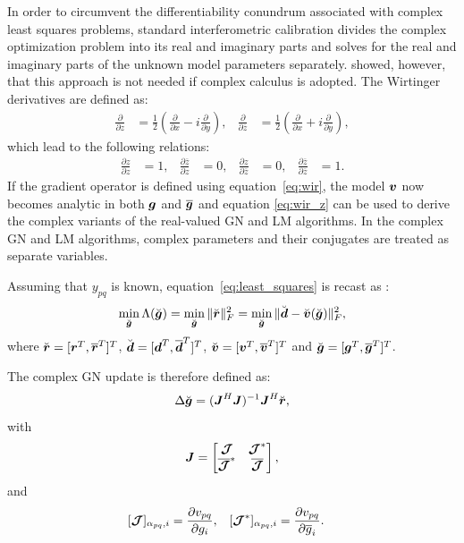\documentclass[useAMS,usenatbib]{mn2e}
\newcommand{\br}{\bmath{r}}
\newcommand{\bg}{\bmath{g}}
\newcommand{\bd}{\bmath{d}}
\newcommand{\bv}{\bmath{v}}
\newcommand{\bJ}{\bmath{J}}
\newcommand{\bmJ}{\bmath{\mathcal{J}}}
\newcommand{\conj}[1]{\overline{#1}}
\begin{document}
In order to circumvent the differentiability conundrum associated with complex least squares problems, standard interferometric calibration divides the complex optimization problem into its real and imaginary parts and solves for the real and imaginary parts of the unknown model parameters separately. \citet{Smirnov2015} showed, however, that this approach is not needed if complex calculus \citep{Wirtinger1927} is adopted. The Wirtinger derivatives are defined as:
\begin{align}
\label{eq:wir}
\frac{\partial}{\partial z} &= \frac{1}{2}\left ( \frac{\partial}{\partial x} -  i \frac{\partial}{\partial y} \right ),&\frac{\partial}{\partial \conj{z}} &= \frac{1}{2}\left ( \frac{\partial}{\partial x} +  i \frac{\partial}{\partial y} \right ), 
\end{align}
which lead to the following relations:
\begin{align}
\label{eq:wir_z}
\frac{\partial z}{\partial z} & = 1, & \frac{\partial \conj{z}}{\partial z}&=0, & \frac{\partial z}{\partial \conj{z}} & = 0, & \frac{\partial \conj{z}}{\partial \conj{z}}&=1.
\end{align}
If the gradient operator is defined using equation~\ref{eq:wir}, the model $\bv$ now becomes analytic in both $\bg$ and $\conj{\bg}$ and equation \ref{eq:wir_z} can be used to derive the complex variants of the real-valued GN and LM algorithms. In the complex GN and LM algorithms, complex parameters and their conjugates are treated as separate variables.

Assuming that $y_{pq}$ is known, equation~\ref{eq:least_squares} is recast as \citep{Smirnov2015}:
\begin{equation}
\label{eq:least_squares_augmented}
\min_{\breve{\bg}} \Lambda(\breve{\bg}) = \min_{\breve{\bg}} \|\breve{\br}\|_F^2 = \min_{\breve{\bg}} \|\breve{\bd} - \breve{\bv}(\breve{\bg})\|_F^2, 
\end{equation} 
where $\breve{\br} = [\br^T,\conj{\br}^T]^T$, $\breve{\bd} = [\bd^T,\conj{\bd}^T]^T$, $\breve{\bv} = [\bv^T,\conj{\bv}^T]^T$ and $\breve{\bg} = [\bg^T,\conj{\bg}^T]^T$.

The complex GN update is therefore defined as:
\begin{equation}
\label{eq:GN_update_skymodel}
 \Delta \breve{\bg} = (\bJ^H\bJ)^{-1}\bJ^H\breve{\br},
\end{equation}
with 
\begin{equation}
\label{eq:Jacobian_skymodel}
\bJ = \begin{bmatrix}
       \bmJ & \bmJ^*\\
       \conj{\bmJ}^* & \conj{\bmJ} 
      \end{bmatrix},
\end{equation}
and
\begin{align}
\label{eq:jac_entries}
[\bmJ]_{\alpha_{pq},i} &= \frac{\partial v_{pq}}{\partial g_i}, & [\bmJ^*]_{\alpha_{pq},i} &= \frac{\partial v_{pq}}{\partial \conj{g}_i}. 
\end{align}
\end{document}
